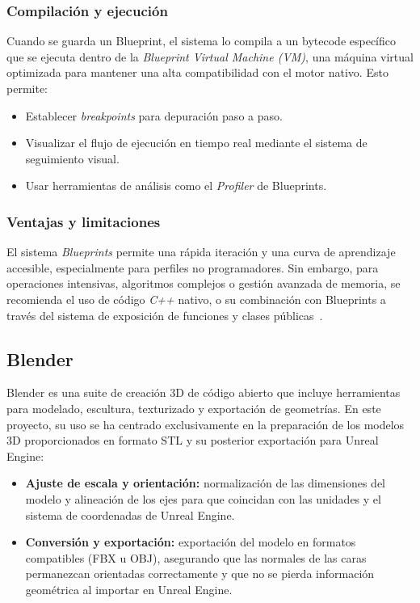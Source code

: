 \subsubsection*{Compilación y ejecución}

Cuando se guarda un Blueprint, el sistema lo compila a un bytecode específico que se ejecuta dentro de la \textit{Blueprint Virtual Machine (VM)}, una máquina virtual optimizada para mantener una alta compatibilidad con el motor nativo. Esto permite:

\begin{itemize}
    \item Establecer \textit{breakpoints} para depuración paso a paso.
    \item Visualizar el flujo de ejecución en tiempo real mediante el sistema de seguimiento visual.
    \item Usar herramientas de análisis como el \textit{Profiler} de Blueprints.
\end{itemize}

\subsubsection*{Ventajas y limitaciones}

El sistema \textit{Blueprints} permite una rápida iteración y una curva de aprendizaje accesible, especialmente para perfiles no programadores. Sin embargo, para operaciones intensivas, algoritmos complejos o gestión avanzada de memoria, se recomienda el uso de código \textit{C++} nativo, o su combinación con Blueprints a través del sistema de exposición de funciones y clases públicas~\cite{millerblueprintcpp}.

\subsection{Blender}

Blender es una suite de creación 3D de código abierto que incluye herramientas para modelado, escultura, texturizado y exportación de geometrías. En este proyecto, su uso se ha centrado exclusivamente en la preparación de los modelos 3D proporcionados en formato STL y su posterior exportación para Unreal Engine:

\begin{itemize}
  \item \textbf{Ajuste de escala y orientación:} normalización de las dimensiones del modelo y alineación de los ejes para que coincidan con las unidades y el sistema de coordenadas de Unreal Engine.
  \item \textbf{Conversión y exportación:} exportación del modelo en formatos compatibles (FBX u OBJ), asegurando que las normales de las caras permanezcan orientadas correctamente y que no se pierda información geométrica al importar en Unreal Engine.
  
\end{itemize}
